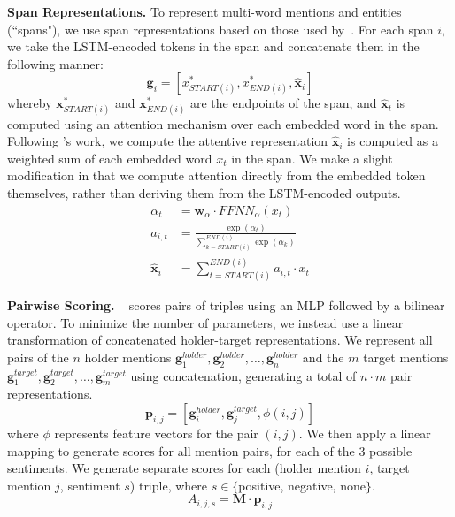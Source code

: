 \documentclass[11pt,a4paper]{article}
\begin{document}
\noindent\textbf{Span Representations.}
To represent multi-word mentions and entities (``spans"), we use span representations based on those used by~.
For each span $i$, we take the LSTM-encoded tokens in the span and concatenate them in the following manner:
\begin{equation*}
\textbf{g}_i = [x^*_{START(i)}, x^*_{END(i)}, \hat{\textbf{x}}_i]
\end{equation*}
whereby $\textbf{x}^*_{START(i)}$ and $\textbf{x}^*_{END(i)}$ are the endpoints of the span, and $\hat{\textbf{x}}_t$ is computed using an attention mechanism over each embedded word in the span.
Following \cite{Lee:17}'s work, we compute the attentive representation $\hat{\textbf{x}}_i$ is computed as a weighted sum of each embedded word $x_t$ in the span.
We make a slight modification in that we compute attention directly from the embedded token themselves, rather than deriving them from the LSTM-encoded outputs.
\begin{align*}
	\alpha_t & = \textbf{w}_\alpha \cdot FFNN_\alpha (x_t) \\
	a_{i, t} & = \frac{\exp{(\alpha_t)}}{\sum^{END(i)}_{k=START(i)} \exp{(\alpha_k)}} \\
	\hat{\textbf{x}}_i & = \sum^{END(i)}_{t = START(i)} a_{i, t}\cdot x_t
\end{align*}

\noindent\textbf{Pairwise Scoring.}
~ scores pairs of triples using an MLP followed by a bilinear operator.
To minimize the number of parameters, we instead use a linear transformation of concatenated holder-target representations. 
We represent all pairs of the $n$ holder mentions $\textbf{g}_{1}^{holder}, \textbf{g}_{2}^{holder},\dots,\textbf{g}_{n}^{holder}$ and the $m$ target mentions $\textbf{g}_{1}^{target}, \textbf{g}_{2}^{target},\dots,\textbf{g}_{m}^{target}$ using concatenation, generating a total of $n\cdot m$ pair representations.
	$$\textbf{p}_{i, j} = [\textbf{g}_i^{holder}, \textbf{g}_j^{target}, \phi(i, j)]$$
where $\phi$ represents feature vectors for the pair $(i, j)$.
We then apply a linear mapping to generate scores for all mention pairs, for each of the 3 possible sentiments. We generate separate scores for each (holder mention $i$, target mention $j$, sentiment $s$) triple, where $s\in\{$positive, negative, none$\}$.
	$$A_{i, j, s} = \textbf{M}\cdot \textbf{p}_{i,j}$$

\end{document}
